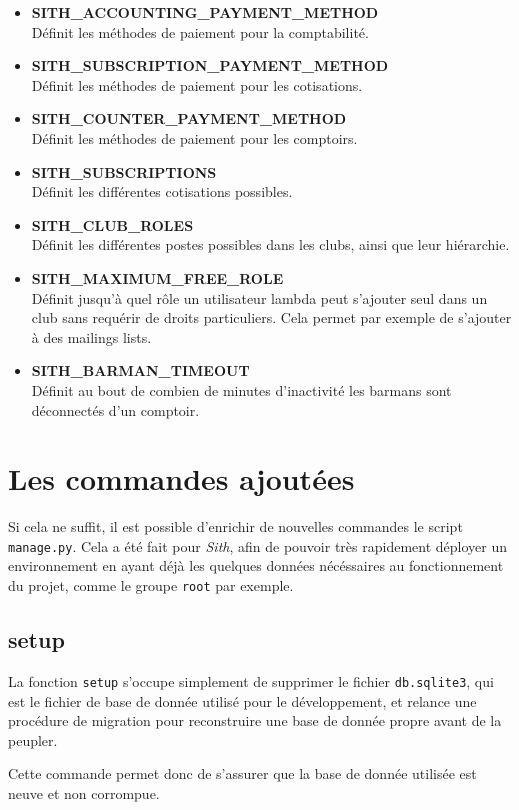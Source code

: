 \documentclass[a4paper]{report}
\begin{document}
\begin{itemize}
    \item \textbf{SITH\_ACCOUNTING\_PAYMENT\_METHOD} \\
        Définit les méthodes de paiement pour la comptabilité.
    \item \textbf{SITH\_SUBSCRIPTION\_PAYMENT\_METHOD} \\
        Définit les méthodes de paiement pour les cotisations.
    \item \textbf{SITH\_COUNTER\_PAYMENT\_METHOD} \\
        Définit les méthodes de paiement pour les comptoirs.
    \item \textbf{SITH\_SUBSCRIPTIONS} \\
        Définit les différentes cotisations possibles.
    \item \textbf{SITH\_CLUB\_ROLES} \\
        Définit les différentes postes possibles dans les clubs, ainsi que leur hiérarchie.
    \item \textbf{SITH\_MAXIMUM\_FREE\_ROLE} \\
        Définit jusqu'à quel rôle un utilisateur lambda peut s'ajouter seul dans un club sans requérir de droits
        particuliers. Cela permet par exemple de s'ajouter à des mailings lists.
    \item \textbf{SITH\_BARMAN\_TIMEOUT} \\
        Définit au bout de combien de minutes d'inactivité les barmans sont déconnectés d'un comptoir.
\end{itemize}


\section{Les commandes ajoutées}
\label{sec:les_commandes_ajout_es}
\par Si cela ne suffit, il est possible d'enrichir de nouvelles commandes le script \verb#manage.py#. Cela a été fait
pour \emph{Sith}, afin de pouvoir très rapidement déployer un environnement en ayant déjà les quelques données
nécéssaires au fonctionnement du projet, comme le groupe \verb#root# par exemple.

\subsection{setup}
\label{sub:setup}
\par La fonction \verb#setup# s'occupe simplement de supprimer le fichier \verb#db.sqlite3#, qui est le fichier de base
de donnée utilisé pour le développement, et relance une procédure de migration pour reconstruire une base de donnée
propre avant de la peupler.
\par Cette commande permet donc de s'assurer que la base de donnée utilisée est neuve et non corrompue.
\end{document}
